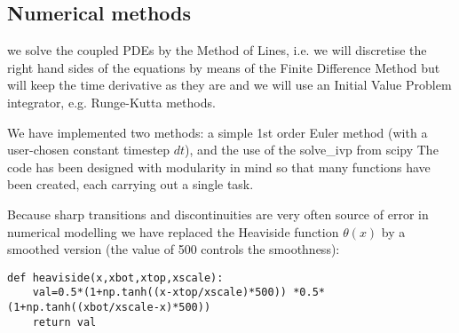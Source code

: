 \documentclass[a4paper]{article}
\newcommand{\python}{\color{darkgray} \sffamily }
\begin{document}
\subsection*{Numerical methods}

we solve the coupled PDEs by the Method of Lines, i.e.
we will discretise the right hand sides of the equations by means of the Finite 
Difference Method but will keep the time derivative as they are and we will 
use an Initial Value Problem integrator, e.g. Runge-Kutta methods.

We have implemented two methods: a simple 1st order Euler method (with a 
user-chosen constant timestep $dt$), and 
the use of the {\python solve\_ivp} from {\python scipy} %
The code has been designed with modularity in mind so that many functions 
have been created, each carrying out a single task.

Because sharp transitions and discontinuities are very often source of error
in numerical modelling we have replaced the Heaviside function $\theta(x)$
by a smoothed version (the value of 500 controls the smoothness):

\begin{lstlisting}
def heaviside(x,xbot,xtop,xscale):
    val=0.5*(1+np.tanh((x-xtop/xscale)*500)) *0.5*(1+np.tanh((xbot/xscale-x)*500))
    return val 
\end{lstlisting}
\end{document}
